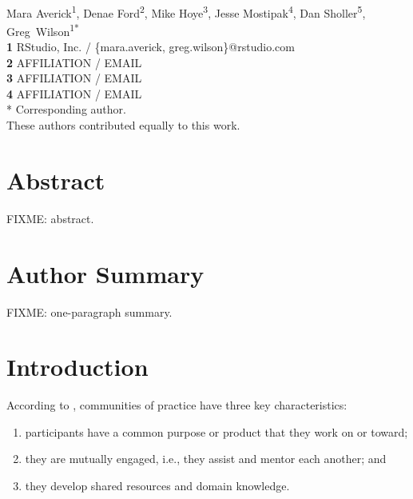 \documentclass[10pt,letterpaper]{article}
\begin{document}
\vspace*{0.2in}

\begin{flushleft}
{\Large
\textbf{}
}
\newline
\\
{Mara Averick}\textsuperscript{1{\ddag}},
{Denae Ford}\textsuperscript{2{\ddag}},
{Mike Hoye}\textsuperscript{3{\ddag}},
{Jesse Mostipak}\textsuperscript{4{\ddag}},
{Dan Sholler}\textsuperscript{5{\ddag}},
{Greg~Wilson}\textsuperscript{1{\ddag}*}
\\
\bigskip
\textbf{1} RStudio, Inc. / \{mara.averick, greg.wilson\}@rstudio.com \\
\textbf{2} AFFILIATION / EMAIL \\
\textbf{3} AFFILIATION / EMAIL \\
\textbf{4} AFFILIATION / EMAIL \\
\bigskip
* Corresponding author. \\
\bigskip
{\ddag} These authors contributed equally to this work.
\end{flushleft}

\section*{Abstract}

FIXME: abstract.

\section*{Author Summary}

FIXME: one-paragraph summary.

\section*{Introduction}

According to \cite{b:wenger-cop}, communities of practice have three key characteristics:

\begin{enumerate}

\item participants have a common purpose or product that they work on or toward;

\item they are mutually engaged, i.e., they assist and mentor each another; and

\item they develop shared resources and domain knowledge.

\end{enumerate}
\end{document}
